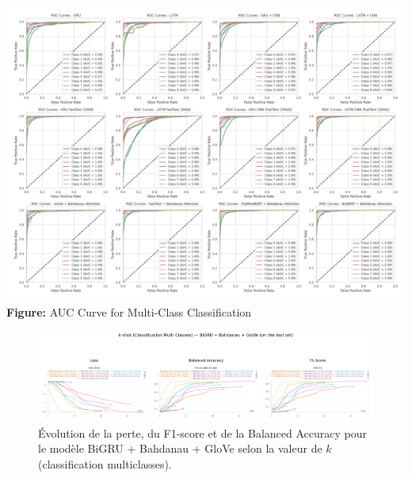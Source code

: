 \documentclass[12pt]{report}
\begin{document}
\begin{center}
\begin{minipage}[t]{\textwidth}
\centering
\includegraphics[width=\linewidth]{auc_multi_class.png}
\small\textbf{Figure:} AUC Curve for Multi-Class Classification
\label{fig:auc_multi}
\end{minipage}
\end{center}
\begin{figure}[H]
\centering
\includegraphics[width=1\textwidth]{kshot_multi_biGRU.png}
\caption{Évolution de la perte, du F1-score et de la Balanced Accuracy pour le modèle BiGRU + Bahdanau + GloVe selon la valeur de $k$ (classification multiclasses).}
\label{fig:kshot_multi_bi_Gru}
\end{figure}
\end{document}
